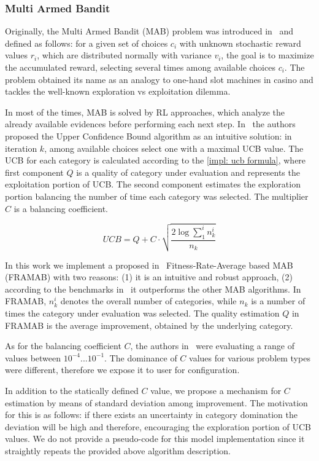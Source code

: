 \subsubsection{Multi Armed Bandit}
Originally, the Multi Armed Bandit (MAB) problem was introduced in~\cite{robbins1952some} and defined as follows: for a given set of choices $c_i$ with unknown stochastic reward values $r_i$, which are distributed normally with variance $v_i$, the goal is to maximize the accumulated reward, selecting several times among available choices $c_i$. The problem obtained its name as an analogy to one-hand slot machines in casino and tackles the well-known exploration vs exploitation dilemma.

In most of the times, MAB is solved by RL approaches, which analyze the already available evidences before performing each next step. In~\cite{auer2002finite} the authors proposed the Upper Confidence Bound algorithm as an intuitive solution: in iteration $k$, among available choices select one with a maximal UCB value. The UCB for each category is calculated according to the \cref{impl: ucb formula}, where first component $Q$ is a quality of category under evaluation and represents the exploitation portion of UCB. The second component estimates the exploration portion balancing the number of time each category was selected. The multiplier $C$ is a balancing coefficient.

\begin{equation}
UCB = Q + C \cdot \sqrt{\frac{2 \log \sum_{1}^{i} n_k^i}{n_k}}
\label{impl: ucb formula}
\end{equation}

In this work we implement a proposed in~\cite{li2013adaptive} Fitness-Rate-Average based MAB (FRAMAB) with two reasons: (1) it is an intuitive and robust approach, (2) according to the benchmarks in~\cite{ferreira2017multi} it outperforms the other MAB algorithms. In FRAMAB, $n_k^i$ denotes the overall number of categories, while $n_k$ is a number of times the category under evaluation was selected. The quality estimation $Q$ in FRAMAB is the average improvement, obtained by the underlying category.

As for the balancing coefficient $C$, the authors in~\cite{ferreira2017multi} were evaluating a range of values between $10^{-4}...10^{-1}$. The dominance of $C$ values for various problem types were different, therefore we expose it to user for configuration. 

In addition to the statically defined $C$ value, we propose a mechanism for $C$ estimation by means of standard deviation among improvement. The motivation for this is as follows: if there exists an uncertainty in category domination the deviation will be high and therefore, encouraging the exploration portion of UCB values. We do not provide a pseudo-code for this model implementation since it straightly repeats the provided above algorithm description.


